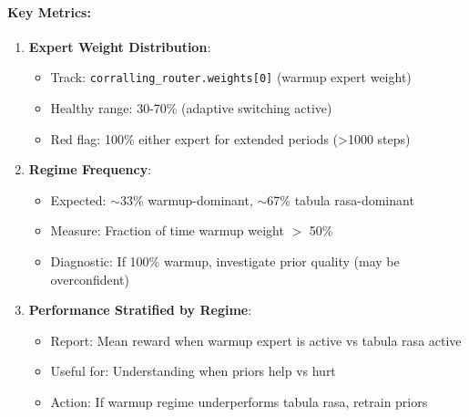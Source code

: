 \paragraph{Key Metrics:}
\begin{enumerate}[leftmargin=*, itemsep=2pt]
    \item \textbf{Expert Weight Distribution}:
    \begin{itemize}
        \item Track: \texttt{corralling\_router.weights[0]} (warmup expert weight)
        \item Healthy range: 30-70\% (adaptive switching active)
        \item Red flag: 100\% either expert for extended periods (>1000 steps)
    \end{itemize}
    
    \item \textbf{Regime Frequency}:
    \begin{itemize}
        \item Expected: $\sim$33\% warmup-dominant, $\sim$67\% tabula rasa-dominant
        \item Measure: Fraction of time warmup weight $>$ 50\%
        \item Diagnostic: If 100\% warmup, investigate prior quality (may be overconfident)
    \end{itemize}
    
    \item \textbf{Performance Stratified by Regime}:
    \begin{itemize}
        \item Report: Mean reward when warmup expert is active vs tabula rasa active
        \item Useful for: Understanding when priors help vs hurt
        \item Action: If warmup regime underperforms tabula rasa, retrain priors
    \end{itemize}
\end{enumerate}

